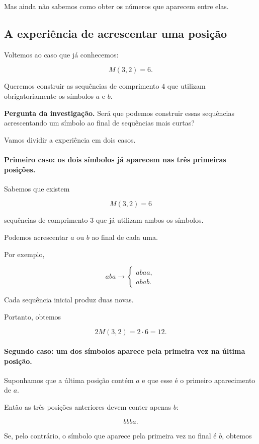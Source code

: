 \documentclass[11pt,a4paper,oneside]{book}
\newcommand{\Pergunta}[1]{\begin{perguntabox}\textbf{Pergunta da investigação.} #1\end{perguntabox}}
\begin{document}
Mas ainda não sabemos como obter
os números que aparecem entre elas.

\subsection*{A experiência de acrescentar uma posição}

Voltemos ao caso que já conhecemos:

\[
M(3,2)=6.
\]

Queremos construir as sequências de
comprimento $4$ que utilizam
obrigatoriamente os símbolos $a$ e $b$.

\Pergunta{Será que podemos construir essas
sequências acrescentando um símbolo
ao final de sequências mais curtas?}

Vamos dividir a experiência em dois casos.

\paragraph{Primeiro caso: os dois símbolos
já aparecem nas três primeiras posições.}

Sabemos que existem

\[
M(3,2)=6
\]

sequências de comprimento $3$
que já utilizam ambos os símbolos.

Podemos acrescentar $a$ ou $b$
ao final de cada uma.

Por exemplo,

\[
aba\longrightarrow
\begin{cases}
abaa,\\
abab.
\end{cases}
\]

Cada sequência inicial produz duas novas.

Portanto, obtemos

\[
2M(3,2)=2\cdot6=12.
\]

\paragraph{Segundo caso: um dos símbolos
aparece pela primeira vez na última posição.}

Suponhamos que a última posição contém $a$
e que esse é o primeiro aparecimento de $a$.

Então as três posições anteriores
devem conter apenas $b$:

\[
bbba.
\]

Se, pelo contrário, o símbolo que aparece
pela primeira vez no final é $b$,
obtemos
\end{document}
